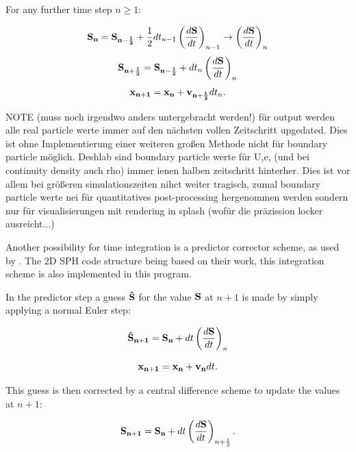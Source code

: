 \documentclass{report}
\begin{document}
For any further time step $n\ge1$:

\begin{equation}
{\bf S_n}={\bf S_{n-\frac{1}{2}}}+\frac{1}{2}dt_{n-1}\left(\frac{d{\bf S}}{dt}\right)_{n-1} \rightarrow
\left(\frac{d{\bf S}}{dt}\right)_n 
\end{equation}
\begin{equation}
{\bf S_{n+\frac{1}{2}}}={\bf S_{n-\frac{1}{2}}}+dt_n\left(\frac{d{\bf S}}{dt}\right)_n 
\end{equation}
\begin{equation}
{\bf x_{n+1}}={\bf x_n}+{\bf v_{n+\frac{1}{2}}}dt_n .
\end{equation}

NOTE (muss noch irgendwo anders untergebracht werden!) für output werden alle real particle werte immer auf den nächsten vollen Zeitschritt upgedated. Dies ist ohne Implementierung einer weiteren großen Methode nicht für boundary particle möglich. Deshlab sind boundary particle werte für U,e, (und bei continuity density auch rho) immer ienen halben zeitschritt hinterher. Dies ist vor allem bei größeren simulationszeiten nihct weiter tragisch, zumal boundary particle werte nei für quantitatives post-processing hergenommen werden sondern nur für visualisierungen mit rendering in splash (wofür die präzission locker ausreicht...)

Another possibility for time integration is a predictor corrector scheme, as
used by \cite{Hu2007}.
The 2D SPH code structure being based on their work,
this integration scheme is also implemented in this program.

In the predictor step a guess ${\bf \hat S}$ for the value ${\bf S}$ at $n+1$ is made by simply
applying a normal Euler step:

\begin{equation}
{\bf \hat S_{n+1}}={\bf S_n}+dt\left(\frac{d{\bf S}}{dt}\right)_n
\end{equation}

\begin{equation}
{\bf x_{n+1}}={\bf x_n}+ {\bf v_{n}}dt.
\end{equation}

This guess is then corrected by a central difference scheme to update the values at
$n+1$:

\begin{equation}
{\bf S_{n+1}}={\bf S_n}+dt\left(\frac{d{\bf S}}{dt}\right)_{n+\frac{1}{2}}.
\end{equation}
\end{document}
